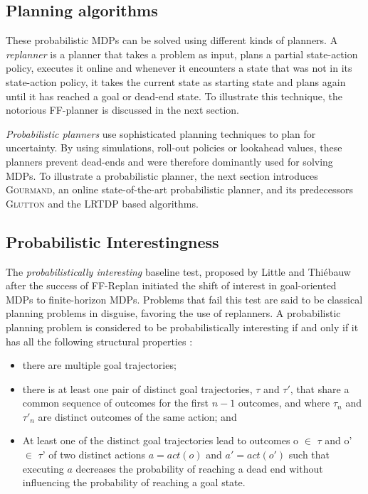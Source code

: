 \documentclass[runningheads,a4paper]{llncs}
\begin{document}
\subsection{Planning algorithms}
 
These probabilistic MDPs can be solved using different kinds of planners. A \emph{replanner} is a planner that takes a problem as input, plans a partial state-action policy, executes it online and whenever it encounters a state that was not in its state-action policy, it takes the current state as starting state and plans again until it has reached a goal or dead-end state. To illustrate this technique, the notorious FF-planner is discussed in the next section. 

\emph{Probabilistic planners} use sophisticated planning techniques to plan for uncertainty. By using simulations, roll-out policies or lookahead values, these planners prevent dead-ends and were therefore dominantly used for solving MDPs. To illustrate a probabilistic planner, the next section introduces \textsc{Gourmand}, an online state-of-the-art probabilistic planner, and its predecessors \textsc{Glutton} and the LRTDP based algorithms.

\subsection{Probabilistic Interestingness}
The \emph{probabilistically interesting} baseline test, proposed by Little and Thi\'ebauw \cite{little2007probvsreplan} after the success of FF-Replan initiated the shift of interest in goal-oriented MDPs to finite-horizon MDPs. Problems that fail this test are said to be classical planning problems in disguise, favoring the use of replanners. A probabilistic planning problem is considered to be probabilistically interesting if and only if it has all the following structural properties \cite{little2007probvsreplan}:

\begin{itemize}
	\item there are multiple goal trajectories;
	\item there is at least one pair of distinct goal trajectories, $\tau$ and $\tau'$, that share a common sequence of outcomes for the first $n-1$ outcomes, and where $\tau_n$ and $\tau'_n$ are distinct outcomes of the same action; and
	\item At least one of the distinct goal trajectories lead to outcomes o $\in$ $\tau$ and o' $\in$ $\tau$' of two distinct actions $a = act(o)$ and $a'= act(o')$ such that executing $a$ decreases the probability of reaching a dead end without influencing the probability of reaching a goal state. 
\end{itemize}
\end{document}
